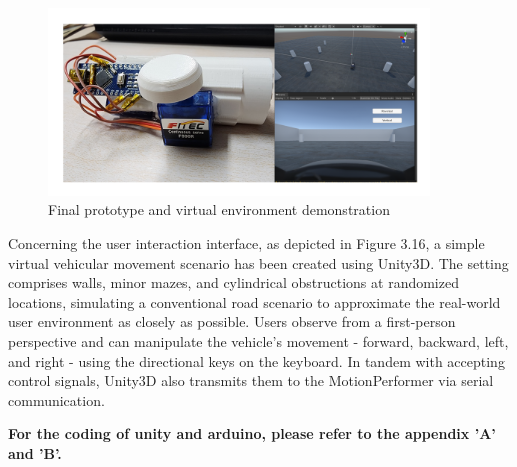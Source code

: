 \begin{figure}[h]
\centering
\includegraphics[width=0.9\textwidth]{A_thesis/figures/031.png}
\caption{Final prototype and virtual environment demonstration}
\end{figure}
Concerning the user interaction interface, as depicted in Figure 3.16, a simple virtual vehicular movement scenario has been created using Unity3D. The setting comprises walls, minor mazes, and cylindrical obstructions at randomized locations, simulating a conventional road scenario to approximate the real-world user environment as closely as possible. Users observe from a first-person perspective and can manipulate the vehicle's movement - forward, backward, left, and right - using the directional keys on the keyboard. In tandem with accepting control signals, Unity3D also transmits them to the MotionPerformer via serial communication.


\textbf{For the coding of unity and arduino, please refer to the appendix 'A' and 'B'.}
